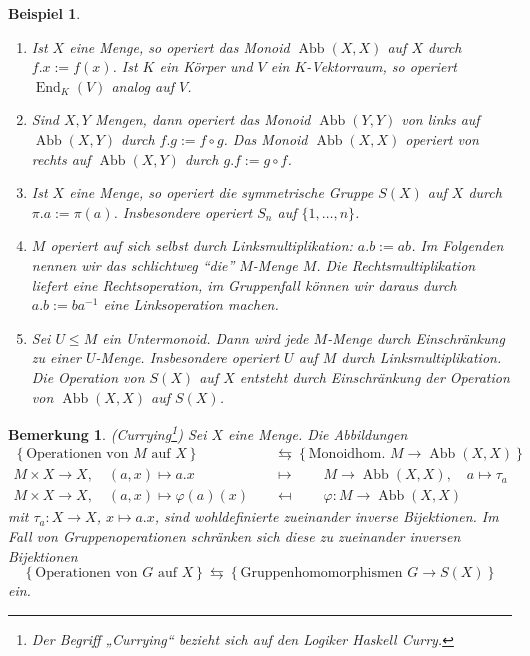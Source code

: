 \documentclass[a4paper, twoside, 11pt, ngerman]{report}
\DeclareMathOperator{\Abb}{Abb}
\DeclareMathOperator{\End}{End}
\theoremstyle{definistyle}
\newtheorem{bem}[satz]{Bemerkung}
\newtheorem{bsp}[satz]{Beispiel}
\theoremstyle{remark}
\begin{document}
\begin{bsp}\label{bsp:operationen}
\begin{enumerate}[label=(\alph*)]
    \item Ist $X$ eine Menge, so operiert das Monoid $\Abb(X, X)$ auf $X$ durch $f . x := f(x)$. Ist $K$ ein Körper und $V$ ein $K$-Vektorraum, so operiert $\End_K(V)$ analog auf $V$.
    \item Sind $X, Y$ Mengen, dann operiert das Monoid $\Abb(Y, Y)$  von links auf $\Abb(X, Y)$ durch $f . g := f \circ g$.
    Das Monoid $\Abb(X, X)$ operiert von rechts auf $\Abb(X, Y)$ durch $g . f := g \circ f$.
    \item Ist $X$ eine Menge, so operiert die symmetrische Gruppe $S(X)$ auf $X$ durch $\pi . a := \pi(a)$. Insbesondere operiert $S_n$ auf $\{1, \dots, n\}$.
    \item $M$ operiert auf sich selbst durch Linksmultiplikation: $a . b := a b$.
    Im Folgenden nennen wir das schlichtweg "`die"' $M$-Menge $M$. Die Rechtsmultiplikation liefert eine Rechtsoperation,
    im Gruppenfall können wir daraus  durch $a . b := b a^{-1}$ eine Linksoperation machen.
    \item Sei $U \leq M$ ein Untermonoid.
    Dann wird jede $M$-Menge durch Einschränkung zu einer $U$-Menge. Insbesondere operiert $U$ auf $M$ durch Linksmultiplikation. Die Operation von $S(X)$ auf $X$ entsteht durch Einschränkung der Operation von $\Abb(X, X)$ auf $S(X)$.
\end{enumerate}
\end{bsp}

\begin{bem}\label{bem:currying}
(\glqq Currying\grqq \footnote{Der Begriff „Currying“ bezieht sich auf den Logiker Haskell Curry.}) Sei $X$ eine Menge. Die Abbildungen
\begin{align*}
\left\{ \text{Operationen von } M \text{ auf } X \right\} &\leftrightarrows \left\{ \text{Monoidhom. } M \to \Abb(X, X) \right\}\\
M \times X \to X, \quad (a, x) \mapsto a . x \qquad \quad &\mapsto \qquad M \to \Abb(X, X), \quad a \mapsto \tau_a \\
M \times X \to X, \quad (a, x) \mapsto \varphi(a)(x) \quad &\mapsfrom \qquad \varphi\colon M\to \Abb(X, X)
\end{align*}
mit $\tau_a \colon X \to X$, $x \mapsto a . x$, sind wohldefinierte zueinander inverse Bijektionen.
Im Fall von Gruppenoperationen schränken sich diese zu zueinander inversen Bijektionen
\[
\left\{ \text{Operationen von } G \text{ auf } X \right\} \leftrightarrows \left\{ \text{Gruppenhomomorphismen } G \to S(X) \right\}
\]
ein.
\end{bem}
\end{document}
